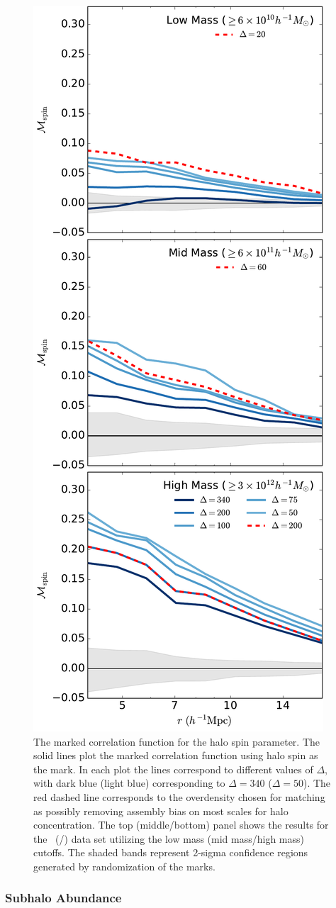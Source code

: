\documentclass[usenatbib,fleqn]{mnras}
\begin{document}
\begin{figure}
	\centering
	\includegraphics[width=.4\textwidth]{all_mcf_spin.pdf}
	\caption{
The marked correlation function for the halo spin parameter. 
The solid lines plot the marked correlation function using halo spin as the mark. In each plot the lines correspond to different values of $\Delta$, with dark blue (light blue) corresponding to $\Delta = 340$ ($\Delta = 50$). The red dashed line corresponds to the overdensity chosen for matching as possibly removing assembly bias on most scales for halo concentration. The top (middle/bottom) panel shows the results for the
\simA \ (\simB /\simC) data set utilizing the low mass (mid mass/high mass) cutoffs. The shaded bands represent 2-sigma confidence regions generated by randomization of the marks.
	}
	\label{fig:cc_mcf_spin}
\end{figure}

\subsubsection{Subhalo Abundance}
\end{document}
